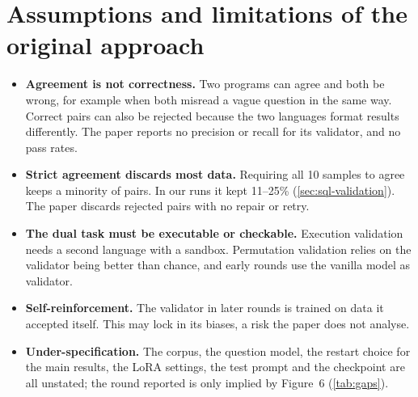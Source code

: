 \section{Assumptions and limitations of the original approach}\label{sec:paper-limits}

\begin{itemize}
\item \textbf{Agreement is not correctness.} Two programs can agree and both be wrong, for example when both misread a
vague question in the same way. Correct pairs can also be rejected because the two languages format results
differently. The paper reports no precision or recall for its validator, and no pass rates.
\item \textbf{Strict agreement discards most data.} Requiring all 10 samples to agree keeps a minority of pairs. In our
runs it kept 11--25\% (\cref{sec:sql-validation}). The paper discards rejected pairs with no repair or retry.
\item \textbf{The dual task must be executable or checkable.} Execution validation needs a second language with a
sandbox. Permutation validation relies on the validator being better than chance, and early rounds use the vanilla
model as validator.
\item \textbf{Self-reinforcement.} The validator in later rounds is trained on data it accepted itself. This may lock in
its biases, a risk the paper does not analyse.
\item \textbf{Under-specification.} The corpus, the question model, the restart choice for the main results, the LoRA
settings, the test prompt and the checkpoint are all unstated; the round reported is only implied by Figure~6
(\cref{tab:gaps}).
\end{itemize}

